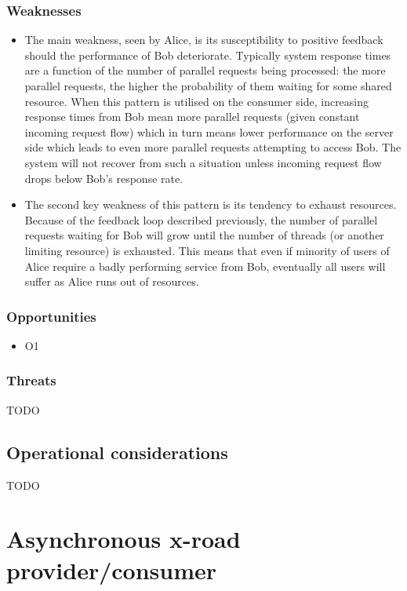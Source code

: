 \documentclass[10pt,a4paper]{article}
\begin{document}
\subsubsection{Weaknesses}
	\begin{itemize}
		\item The main weakness, seen by Alice, is its susceptibility to positive feedback should the performance of Bob deteriorate. Typically system response times are a function of the number of parallel requests being processed: the more parallel requests, the higher the probability of them waiting for some shared resource. When this pattern is utilised on the consumer side, increasing response times from Bob mean more parallel requests (given constant incoming request flow) which in turn means lower performance on the server side which leads to even more parallel requests attempting to access Bob. The system will not recover from such a situation unless incoming request flow drops below Bob's response rate.  
		\item The second key weakness of this pattern is its tendency to exhaust resources. Because of the feedback loop described previously, the number of parallel requests waiting for Bob will grow until the number of threads (or another limiting resource) is exhausted. This means that even if minority of users of Alice require a badly performing service from Bob, eventually all users will suffer as Alice runs out of resources. 
	\end{itemize} 

\subsubsection{Opportunities}
	\begin{itemize}
		\item O1
	\end{itemize}

\subsubsection{Threats}
TODO

\subsection{Operational considerations}
TODO

\section{Asynchronous x-road provider/consumer}
\label{sec:p:5}
\end{document}

